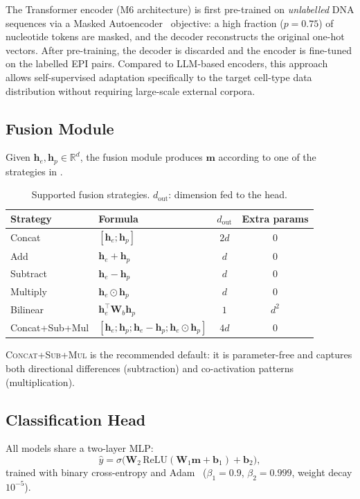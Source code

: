 The Transformer encoder (M6 architecture) is first pre-trained on \emph{unlabelled}
DNA sequences via a Masked Autoencoder~\cite{mae} objective: a high fraction
($p = 0.75$) of nucleotide tokens are masked, and the decoder reconstructs the
original one-hot vectors.
After pre-training, the decoder is discarded and the encoder is fine-tuned on the
labelled EPI pairs.
Compared to LLM-based encoders, this approach allows self-supervised adaptation
specifically to the target cell-type data distribution without requiring
large-scale external corpora.

\subsection{Fusion Module}
\label{sec:fusion}

Given $\mathbf{h}_e, \mathbf{h}_p \in \mathbb{R}^d$, the fusion module produces
$\mathbf{m}$ according to one of the strategies in .

\begin{table}[H]
\centering
\caption{Supported fusion strategies. $d_{\mathrm{out}}$: dimension fed to the head.}
\label{tab:fusion}
\begin{tabular}{llcc}
\toprule
Strategy & Formula & $d_{\mathrm{out}}$ & Extra params \\
\midrule
Concat        & $[\mathbf{h}_e;\mathbf{h}_p]$
              & $2d$ & 0 \\
Add           & $\mathbf{h}_e + \mathbf{h}_p$
              & $d$  & 0 \\
Subtract      & $\mathbf{h}_e - \mathbf{h}_p$
              & $d$  & 0 \\
Multiply      & $\mathbf{h}_e \odot \mathbf{h}_p$
              & $d$  & 0 \\
Bilinear      & $\mathbf{h}_e^\top \mathbf{W}_b \mathbf{h}_p$
              & $1$  & $d^2$ \\
Concat+Sub+Mul & $[\mathbf{h}_e;\mathbf{h}_p;\mathbf{h}_e{-}\mathbf{h}_p;\mathbf{h}_e{\odot}\mathbf{h}_p]$
              & $4d$ & 0 \\
\bottomrule
\end{tabular}
\end{table}

\textsc{Concat+Sub+Mul} is the recommended default: it is parameter-free and captures
both directional differences (subtraction) and co-activation patterns (multiplication).

\subsection{Classification Head}

All models share a two-layer MLP:
\begin{equation}
  \hat{y} = \sigma\!\bigl(\mathbf{W}_2\,\mathrm{ReLU}(\mathbf{W}_1 \mathbf{m}
            + \mathbf{b}_1) + \mathbf{b}_2\bigr),
\end{equation}
trained with binary cross-entropy and Adam~\cite{adam}
($\beta_1 = 0.9$, $\beta_2 = 0.999$, weight decay $10^{-5}$).

